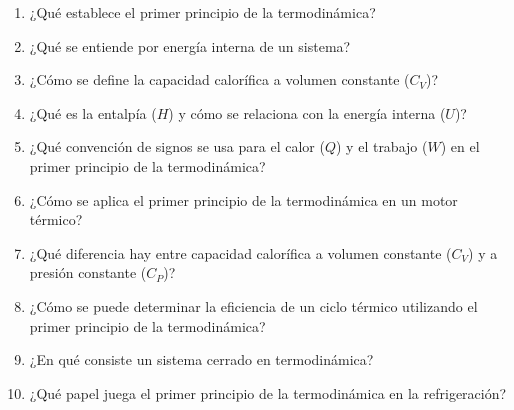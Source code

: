 \documentclass[../main]{subfiles}
\begin{document}
\begin{enumerate}
    \item ¿Qué establece el primer principio de la termodinámica?
    \item ¿Qué se entiende por energía interna de un sistema?
    \item ¿Cómo se define la capacidad calorífica a volumen constante ($C_V$)?
    \item ¿Qué es la entalpía ($H$) y cómo se relaciona con la energía interna ($U$)?
    \item ¿Qué convención de signos se usa para el calor ($Q$) y el trabajo ($W$) en el primer principio de la termodinámica?
    \item ¿Cómo se aplica el primer principio de la termodinámica en un motor térmico?
    \item ¿Qué diferencia hay entre capacidad calorífica a volumen constante ($C_V$) y a presión constante ($C_P$)?
    \item ¿Cómo se puede determinar la eficiencia de un ciclo térmico utilizando el primer principio de la termodinámica?
    \item ¿En qué consiste un sistema cerrado en termodinámica?
    \item ¿Qué papel juega el primer principio de la termodinámica en la refrigeración?

\end{enumerate}
\end{document}

